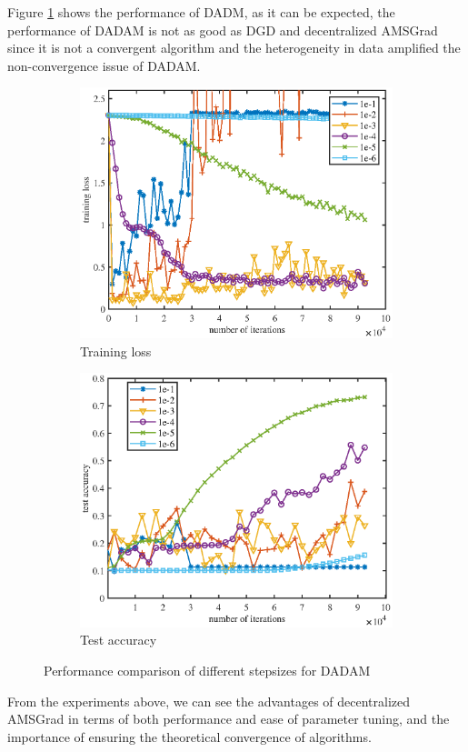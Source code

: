 \documentclass{article} %
\begin{document}
Figure \ref{fig: adam_curve} shows the performance of DADM, as it can be expected, the performance of DADAM is not as good as DGD and decentralized AMSGrad since it is not a convergent algorithm and the heterogeneity in data amplified the non-convergence issue of DADAM.  

\begin{figure}[h]
\centering
	\begin{subfigure}{.45\textwidth}
	\centering
	\includegraphics[width=.9\textwidth]{figures/adam_train.eps}
	\caption{\small Training loss}
	\end{subfigure}
\begin{subfigure}{.45\textwidth}
	\centering
		\includegraphics[width=.9\textwidth]{figures/adam_test.eps}
	\caption{\small  Test accuracy}
	\end{subfigure}
	\caption{Performance comparison of different stepsizes for DADAM}
	\label{fig: adam_curve}
\end{figure}

From the experiments above, we can see the advantages of decentralized AMSGrad in terms of both performance and ease of parameter tuning, and the importance of ensuring the theoretical convergence of algorithms. 
\end{document}
